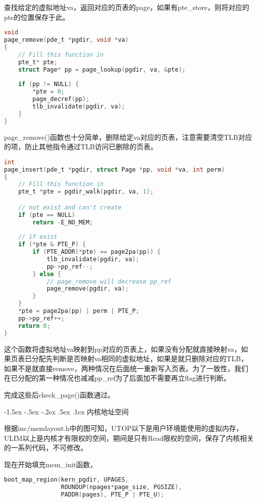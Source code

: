 \documentclass[11pt,a4paper]{article}
\makeatletter
\newcommand{\sanhao}{\fontsize{15.75pt}{\baselineskip}\selectfont}
\renewcommand\section{\@startsection{section}{1}{\z@}%
{-1.5ex \@plus -.5ex \@minus -.2ex}%
{.5ex \@plus .1ex}%
{\normalfont\sanhao\fontspec{黑体}}}
\makeatother
\begin{document}
查找给定的虚拟地址va，返回对应的页表的page，如果有pte\_store，则将对应的pte的位置保存于此。

\setmainfont{Consolas}
\begin{lstlisting}[language={C},firstnumber=698,title=kern/pmap.c]
void
page_remove(pde_t *pgdir, void *va)
{
	// Fill this function in
	pte_t* pte;
	struct Page* pp = page_lookup(pgdir, va, &pte);
	
	if (pp != NULL) {
		*pte = 0;
		page_decref(pp);
		tlb_invalidate(pgdir, va);
	}
}
\end{lstlisting}
\setmainfont[BoldFont=黑体]{宋体}

page\_remove()函数也十分简单，删除给定va对应的页表，注意需要清空TLB对应的项，防止其他指令通过TLB访问已删除的页表。

\setmainfont{Consolas}
\begin{lstlisting}[language={C},firstnumber=634,title=kern/pmap.c]
int
page_insert(pde_t *pgdir, struct Page *pp, void *va, int perm)
{
	// Fill this function in
	pte_t *pte = pgdir_walk(pgdir, va, 1);

	// not exist and can't create
	if (pte == NULL)
		return -E_NO_MEM;
	
	// if exist
	if (*pte & PTE_P) {
		if (PTE_ADDR(*pte) == page2pa(pp)) {
			tlb_invalidate(pgdir, va);
			pp->pp_ref--;
		} else {
			// page_remove will decrease pp_ref
			page_remove(pgdir, va);
		}
	}
	*pte = page2pa(pp) | perm | PTE_P;
	pp->pp_ref++;
	return 0;
}
\end{lstlisting}
\setmainfont[BoldFont=黑体]{宋体}

这个函数将虚拟地址va映射到pp对应的页表上，如果没有分配就直接映射va，如果页表已分配先判断是否映射va相同的虚拟地址，如果是就只删除对应的TLB，如果不是就直接remove，两种情况在后面统一重新写入页表。为了一致性，我们在已分配的第一种情况也减减pp\_ref为了后面加不需要再立flag进行判断。

完成这些后check\_page()函数通过。

\section{内核地址空间}

根据inc/memlayout.h中的图可知，UTOP以下是用户环境能使用的虚拟内存，ULIM以上是内核才有限权的空间，期间是只有Read限权的空间，保存了内核相关的一系列代码，不可修改。

现在开始填充mem\_init函数，

\setmainfont{Consolas}
\begin{lstlisting}[language={C},firstnumber=187,title=kern/pmap.c]
boot_map_region(kern_pgdir, UPAGES,
				ROUNDUP(npages*page_size, PGSIZE),
				PADDR(pages), PTE_P | PTE_U);
\end{lstlisting}
\setmainfont[BoldFont=黑体]{宋体}
\end{document}
